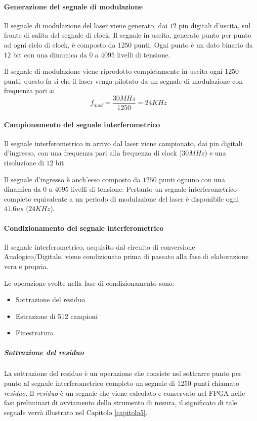 \paragraph{Generazione del segnale di modulazione}
Il segnale di modulazione del laser viene generato, dai $12$ pin digitali d'uscita, sul fronte di salita del segnale di clock. Il segnale in uscita, generato punto per punto ad ogni ciclo di clock, è composto da $1250$ punti. Ogni punto è un dato binario da $12$ bit con una dinamica da $0$ a $4095$ livelli di tensione.

Il segnale di modulazione viene riprodotto completamente in uscita ogni $1250$ punti; questo fa si che il laser venga pilotato da un segnale di modulazione con frequenza pari a:
\begin{equation}
	f_{mod} = \frac{30MHz}{1250} = 24KHz
\end{equation}

\paragraph{Campionamento del segnale interferometrico}
Il segnale interferometrico in arrivo dal laser viene campionato, dai pin digitali d'ingresso, con una frequenza pari alla frequenza di clock ($30MHz$) e una risoluzione di $12$ bit.

Il segnale d'ingresso è anch'esso composto da $1250$ punti ognuno con una dinamica da $0$ a $4095$ livelli di tensione. Pertanto un segnale interferometrico completo equivalente a un periodo di modulazione del laser è disponibile ogni $41.6us$ ($24KHz$).

\paragraph{Condizionamento del segnale interferometrico}
Il segnale interferometrico, acquisito dal circuito di conversione Analogico/Digitale, viene condizionato prima di passato alla fase di elaborazione vera e propria.

Le operazione svolte nella fase di condizionamento sono:
\begin{itemize}
	\item Sottrazione del residuo
	\item Estrazione di 512 campioni
	\item Finestratura
\end{itemize}

\subparagraph{Sottrazione del residuo}
La sottrazione del residuo è un operazione che consiste nel sottrarre punto per punto al segnale interferometrico completo un segnale di $1250$ punti chiamato \textit{residuo}. Il \textit{residuo} è un segnale che viene calcolato e conservato nel FPGA nelle fasi preliminari di avviamento dello strumento di misura, il significato di tale segnale verrà illustrato nel Capitolo \ref{capitolo5}.

